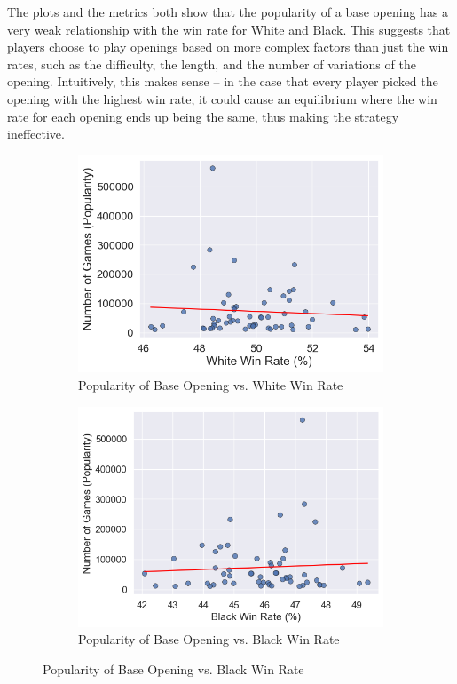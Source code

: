 \documentclass[a4paper, 11pt]{article}
\begin{document}
The plots and the metrics both show that the popularity of a base opening has a very weak relationship with the win rate for White and Black. This suggests that players choose to play openings based on more complex factors than just the win rates, such as the difficulty, the length, and the number of variations of the opening. Intuitively, this makes sense -- in the case that every player picked the opening with the highest win rate, it could cause an equilibrium where the win rate for each opening ends up being the same, thus making the strategy ineffective.

\begin{figure}[H]
    \centering
    \caption{Popularity of Base Opening vs. Win Rates (All Players)}
    \label{fig:popularityOfBaseOpeningVsWinRatesAllPlayers}
    \begin{subfigure}{0.49\textwidth}
        \centering
        \caption{Popularity of Base Opening vs. White Win Rate}
        \label{fig:popularityOfBaseOpeningVsWhiteWinRateAllPlayers}
        \includegraphics[width=\textwidth]{Popularity of Base Opening vs. White Win Rate (All Rated Players).png}
    \end{subfigure}
    \hfill
    \begin{subfigure}{0.49\textwidth}
        \centering
        \caption{Popularity of Base Opening vs. Black Win Rate}
        \label{fig:popularityOfBaseOpeningVsBlackWinRateAllPlayers}
        \includegraphics[width=\textwidth]{Popularity of Base Opening vs. Black Win Rate (All Rated Players).png}

\end{subfigure}
\end{figure}
\end{document}
